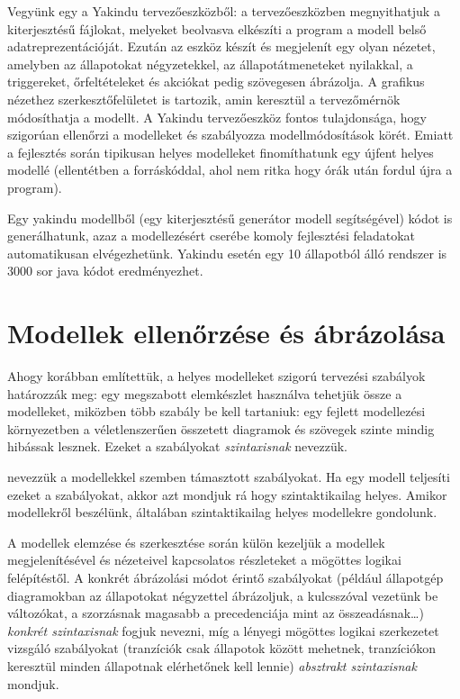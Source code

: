 \begin{pelda}
Vegyünk egy a Yakindu tervezőeszközből: a tervezőeszközben megnyithatjuk a  kiterjesztésű fájlokat, melyeket beolvasva elkészíti a program a modell belső adatreprezentációját. Ezután az eszköz készít és megjelenít egy olyan nézetet, amelyben az állapotokat négyzetekkel, az állapotátmeneteket nyilakkal, a triggereket, őrfeltételeket és akciókat pedig szövegesen ábrázolja. A grafikus nézethez szerkesztőfelületet is tartozik, amin keresztül a tervezőmérnök módosíthatja a modellt. A Yakindu tervezőeszköz fontos tulajdonsága, hogy szigorúan ellenőrzi a modelleket és szabályozza modellmódosítások körét. Emiatt a fejlesztés során tipikusan helyes modelleket finomíthatunk egy újfent helyes modellé (ellentétben a forráskóddal, ahol nem ritka hogy órák után fordul újra a program).

Egy yakindu modellből (egy  kiterjesztésű generátor modell segítségével) kódot is generálhatunk, azaz a modellezésért cserébe komoly fejlesztési feladatokat automatikusan elvégezhetünk. Yakindu esetén egy 10 állapotból álló rendszer is 3000 sor java kódot eredményezhet.
\end{pelda}

\section{Modellek ellenőrzése és ábrázolása}
Ahogy korábban említettük, a helyes modelleket szigorú tervezési szabályok határozzák meg: egy megszabott elemkészlet használva tehetjük össze a modelleket, miközben több szabály be kell tartaniuk: egy fejlett modellezési környezetben a véletlenszerűen összetett diagramok és szövegek szinte mindig hibássak lesznek. Ezeket a szabályokat \emph{szintaxisnak} nevezzük.

\begin{definicio}
 nevezzük a modellekkel szemben támasztott szabályokat. Ha egy modell teljesíti ezeket a szabályokat, akkor azt mondjuk rá hogy szintaktikailag helyes. Amikor modellekről beszélünk, általában szintaktikailag helyes modellekre gondolunk.
\end{definicio}

A modellek elemzése és szerkesztése során külön kezeljük a modellek megjelenítésével és nézeteivel kapcsolatos részleteket a mögöttes logikai felépítéstől. A konkrét ábrázolási módot érintő szabályokat (például állapotgép diagramokban az állapotokat négyzettel ábrázoljuk, a  kulcsszóval vezetünk be változókat, a szorzásnak magasabb a precedenciája mint az összeadásnak\ldots) \emph{konkrét szintaxisnak} fogjuk nevezni, míg a lényegi mögöttes logikai szerkezetet vizsgáló szabályokat (tranzíciók csak állapotok között mehetnek, tranzíciókon keresztül minden állapotnak elérhetőnek kell lennie) \emph{absztrakt szintaxisnak} mondjuk.


